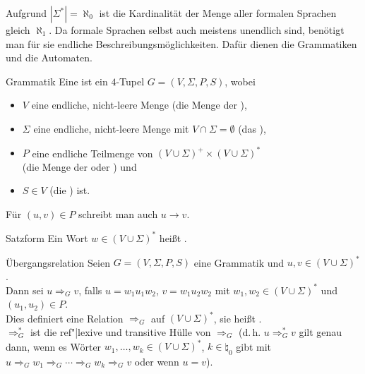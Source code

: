 \begin{Bem}
    Aufgrund $|\Sigma^\ast| = \aleph_0$ ist die Kardinalität der Menge aller
    formalen Sprachen gleich $\aleph_1$.
    Da formale Sprachen selbst auch meistens unendlich sind,
    benötigt man für sie endliche Beschreibungsmöglichkeiten.
    Dafür dienen die Grammatiken und die Automaten.
\end{Bem}

\linie

\begin{Def}{Grammatik}
    Eine  ist ein $4$-Tupel $G = (V, \Sigma, P, S)$, wobei
    \begin{itemize}
        \item
        $V$ eine endliche, nicht-leere Menge
        (die Menge der ),
        
        \item
        $\Sigma$ eine endliche, nicht-leere Menge mit
        $V \cap \Sigma = \emptyset$
        (das ),
        
        \item
        $P$ eine endliche Teilmenge von
        $(V \cup \Sigma)^+ \times (V \cup \Sigma)^\ast$\\
        (die Menge der  oder ) und
        
        \item
        $S \in V$ (die ) ist.
    \end{itemize}
    Für $(u, v) \in P$ schreibt man auch $u \rightarrow v$.
\end{Def}

\begin{Def}{Satzform}
    Ein Wort $w \in (V \cup \Sigma)^\ast$ heißt .
\end{Def}

\begin{Def}{Übergangsrelation}
    Seien $G = (V, \Sigma, P, S)$ eine Grammatik und
    $u, v \in (V \cup \Sigma)^\ast$.\\
    Dann sei $u \Rightarrow_G v$, falls
    $u = w_1 u_1 w_2$, $v = w_1 u_2 w_2$ mit
    $w_1, w_2 \in (V \cup \Sigma)^\ast$ und $(u_1, u_2) \in P$.\\
    Dies definiert eine Relation $\Rightarrow_G$
    auf $(V \cup \Sigma)^\ast$, sie heißt .\\
    $\Rightarrow_G^\ast$ ist die ref"|lexive und transitive Hülle von
    $\Rightarrow_G$
    (d.\,h. $u \Rightarrow_G^\ast v$ gilt genau dann, wenn es Wörter
    $w_1, \dotsc, w_k \in (V \cup \Sigma)^\ast$, $k \in \natural_0$ gibt mit
    $u \Rightarrow_G w_1 \Rightarrow_G \dotsb \Rightarrow_G w_k
    \Rightarrow_G v$ oder wenn $u = v$).
\end{Def}

